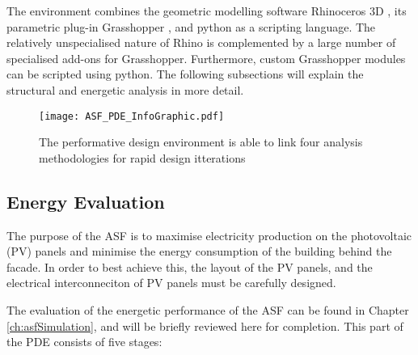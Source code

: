 The environment combines the geometric modelling software Rhinoceros 3D \cite{Rhino}, its parametric plug-in Grasshopper \cite{grasshopper}, and python \cite{python} as a scripting language. The relatively unspecialised nature of Rhino is complemented by a large number of specialised add-ons for Grasshopper. Furthermore, custom Grasshopper modules can be scripted using python. The following subsections will explain the structural and energetic analysis in more detail.

\begin{figure}
\begin{center}
\texttt{[image: ASF\_PDE\_InfoGraphic.pdf]}
\caption{The performative design environment is able to link four analysis methodologies for rapid design itterations}
\label{fig:performative}
\end{center}
\end{figure}

\subsection{Energy Evaluation}
\label{ch:energy}

The purpose of the ASF is to maximise electricity production on the photovoltaic (PV) panels and minimise the energy consumption of the building behind the facade. In order to best achieve this, the layout of the PV panels, and the electrical interconneciton of PV panels must be carefully designed.

The evaluation of the energetic performance of the ASF can be found in Chapter \ref{ch:asfSimulation}, and will be briefly reviewed here for completion. This part of the PDE consists of five stages: 


